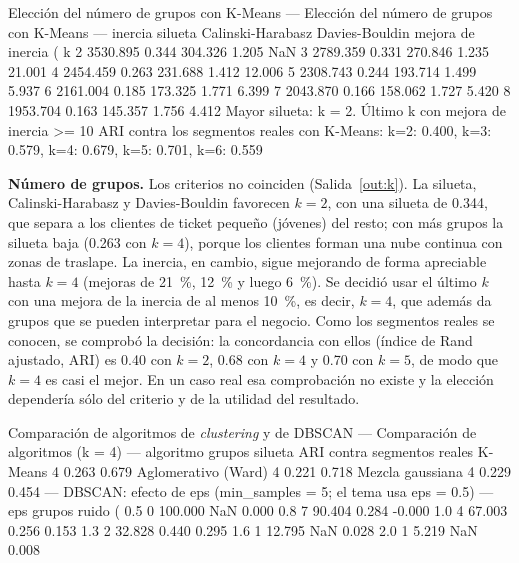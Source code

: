 \documentclass[11pt,letterpaper]{article}
\begin{document}
\begin{consola}[label=out:k]{Elección del número de grupos con K-Means}
--- Elección del número de grupos con K-Means ---
    inercia  silueta  Calinski-Harabasz  Davies-Bouldin  mejora de inercia (%
k
2  3530.895    0.344            304.326           1.205                    NaN
3  2789.359    0.331            270.846           1.235                 21.001
4  2454.459    0.263            231.688           1.412                 12.006
5  2308.743    0.244            193.714           1.499                  5.937
6  2161.004    0.185            173.325           1.771                  6.399
7  2043.870    0.166            158.062           1.727                  5.420
8  1953.704    0.163            145.357           1.756                  4.412
Mayor silueta: k = 2. Último k con mejora de inercia >= 10 %
ARI contra los segmentos reales con K-Means: k=2: 0.400, k=3: 0.579, k=4: 0.679, k=5: 0.701, k=6: 0.559
\end{consola}

\textbf{Número de grupos.} Los criterios no coinciden (Salida~\ref{out:k}). La silueta, Calinski-Harabasz y Davies-Bouldin favorecen $k=2$, con una silueta de 0.344, que separa a los clientes de ticket pequeño (jóvenes) del resto; con más grupos la silueta baja (0.263 con $k=4$), porque los clientes forman una nube continua con zonas de traslape. La inercia, en cambio, sigue mejorando de forma apreciable hasta $k=4$ (mejoras de 21~\%, 12~\% y luego 6~\%). Se decidió usar el último $k$ con una mejora de la inercia de al menos 10~\%, es decir, $k=4$, que además da grupos que se pueden interpretar para el negocio. Como los segmentos reales se conocen, se comprobó la decisión: la concordancia con ellos (índice de Rand ajustado, ARI) es 0.40 con $k=2$, 0.68 con $k=4$ y 0.70 con $k=5$, de modo que $k=4$ es casi el mejor. En un caso real esa comprobación no existe y la elección dependería sólo del criterio y de la utilidad del resultado.

\begin{consola}[label=out:algo]{Comparación de algoritmos de \textit{clustering} y de DBSCAN}
--- Comparación de algoritmos (k = 4) ---
          algoritmo  grupos  silueta  ARI contra segmentos reales
            K-Means       4    0.263                        0.679
Aglomerativo (Ward)       4    0.221                        0.718
   Mezcla gaussiana       4    0.229                        0.454
--- DBSCAN: efecto de eps (min_samples = 5; el tema usa eps = 0.5) ---
 eps  grupos  ruido (%
 0.5       0    100.000                  NaN                        0.000
 0.8       7     90.404                0.284                       -0.000
 1.0       4     67.003                0.256                        0.153
 1.3       2     32.828                0.440                        0.295
 1.6       1     12.795                  NaN                        0.028
 2.0       1      5.219                  NaN                        0.008
\end{consola}
\end{document}
